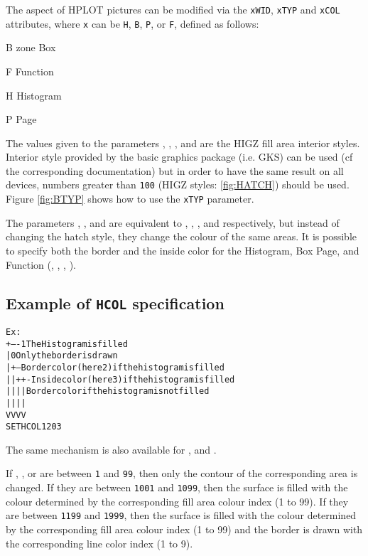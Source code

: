 The aspect of HPLOT pictures can be modified via the \texttt{xWID}, \texttt{xTYP}
and \texttt{xCOL} attributes, where \texttt{x} can be \texttt{H}, \texttt{B},
\texttt{P}, or \texttt{F}, defined as follows:
\begin{DLtt}{12}
\item[B] zone Box
\item[F] Function
\item[H] Histogram
\item[P] Page
\end{DLtt}

The values given to the parameters , , ,
and  are the HIGZ fill area interior styles. Interior style
 provided by the basic graphics package (i.e. GKS) can be used (cf the
corresponding documentation) but in order to have the same result on all 
devices, numbers greater than \texttt{100} (HIGZ styles: \ref{fig:HATCH}) should
be used. Figure \ref{fig:BTYP} shows how to use the \texttt{xTYP} parameter. 

The parameters , ,  and 
are equivalent to , , , and 
respectively, but instead of changing the hatch style, they change the
colour of the same areas. It is possible to specify both the border and
the inside color for the Histogram, Box Page, and Function (, 
, , ).
\subsection*{Example of \texttt{HCOL} specification}
\begin{alltt}
      Ex:
                  +---- 1 The Histogram is filled
                  |     0 Only the border is drawn 
                  |+--- Border color (here 2) if the histogram is filled
                  ||++- Inside color (here 3) if the histogram is filled
                  ||||  Border color if the histogram is not filled
                  ||||
                  VVVV
       SET  HCOL  1203  
\end{alltt}
The same mechanism is also available for ,  and 
.

If , ,  or  are between \texttt{1}
and \texttt{99}, then only the contour of the corresponding area is changed. 
If they are between \texttt{1001} and \texttt{1099}, then the surface is filled with
the colour determined by the corresponding fill area colour index (1 to 99).
If they are between \texttt{1199} and \texttt{1999}, then the surface is filled with
the colour determined by the corresponding fill area colour index (1 to 99)
and the border is drawn with the corresponding line color index (1 to 9).

